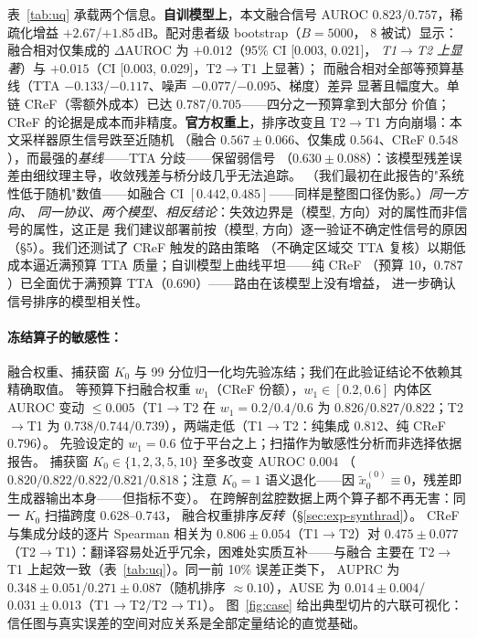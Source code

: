 \documentclass[11pt]{article}
\begin{document}
表~\ref{tab:uq} 承载两个信息。\textbf{自训模型上}，本文融合信号 AUROC
$0.823$/$0.757$，稀疏化增益 $+2.67$/$+1.85$\,dB。配对患者级 bootstrap（$B{=}5000$，
8 被试）显示：融合相对仅集成的 $\Delta$AUROC 为 $+0.012$（95\% CI [0.003, 0.021]，
\emph{T1$\to$T2 上显著}）与 $+0.015$（CI [0.003, 0.029]，T2$\to$T1 上显著）；
而融合相对全部等预算基线（TTA $-0.133$/$-0.117$、噪声 $-0.077$/$-0.095$、梯度）差异
显著且幅度大。单链 CReF（零额外成本）已达 $0.787$/$0.705$——四分之一预算拿到大部分
价值；CReF 的论据是成本而非精度。\textbf{官方权重上}，排序改变且 T2$\to$T1 方向崩塌：本文采样器原生信号跌至近随机
（融合 $0.567\pm0.066$、仅集成 $0.564$、CReF $0.548$），而最强的\emph{基线}——TTA 分歧——保留弱信号
（$0.630\pm0.088$）：该模型残差误差由细纹理主导，收敛残差与桥分歧几乎无法追踪。
（我们最初在此报告的"系统性低于随机"数值——如融合 CI $[0.442, 0.485]$——同样是整图口径伪影。）\emph{同一方向、
同一协议、两个模型、相反结论}：失效边界是（模型, 方向）对的属性而非信号的属性，这正是
我们建议部署前按（模型, 方向）逐一验证不确定性信号的原因（\S5）。我们还测试了 CReF
触发的路由策略
（不确定区域交 TTA 复核）以期低成本逼近满预算 TTA 质量；自训模型上曲线平坦——纯 CReF
（预算 10，$0.787$）已全面优于满预算 TTA（$0.690$）——路由在该模型上没有增益，
进一步确认信号排序的模型相关性。
\paragraph{冻结算子的敏感性：}
融合权重、捕获窗 $K_0$ 与 99 分位归一化均先验冻结；我们在此验证结论不依赖其精确取值。
等预算下扫融合权重 $w_1$（CReF 份额），$w_1\in[0.2,0.6]$ 内体区 AUROC 变动
$\le0.005$（T1$\to$T2 在 $w_1{=}0.2/0.4/0.6$ 为 $0.826/0.827/0.822$；T2$\to$T1 为
$0.738/0.744/0.739$），两端走低（T1$\to$T2：纯集成 $0.812$、纯 CReF $0.796$）。
先验设定的 $w_1{=}0.6$ 位于平台之上；扫描作为敏感性分析而非选择依据报告。
捕获窗 $K_0\in\{1,2,3,5,10\}$ 至多改变 AUROC $0.004$
（$0.820/0.822/0.822/0.821/0.818$；注意 $K_0{=}1$ 语义退化——因
$\tilde x_0^{(0)}\equiv0$，残差即生成器输出本身——但指标不变）。
在跨解剖盆腔数据上两个算子都不再无害：同一 $K_0$ 扫描跨度 $0.628$--$0.743$，
融合权重排序\emph{反转}（\S\ref{sec:exp-synthrad}）。
CReF 与集成分歧的逐片 Spearman 相关为 $0.806\pm0.054$（T1$\to$T2）对
$0.475\pm0.077$（T2$\to$T1）：翻译容易处近乎冗余，困难处实质互补——与融合
主要在 T2$\to$T1 上起效一致（表~\ref{tab:uq}）。同一前 10\% 误差正类下，
AUPRC 为 $0.348\pm0.051$/$0.271\pm0.087$（随机排序 $\approx0.10$），AUSE 为
$0.014\pm0.004$/$0.031\pm0.013$（T1$\to$T2/T2$\to$T1）。
图~\ref{fig:case} 给出典型切片的六联可视化：
信任图与真实误差的空间对应关系是全部定量结论的直觉基础。
\end{document}
